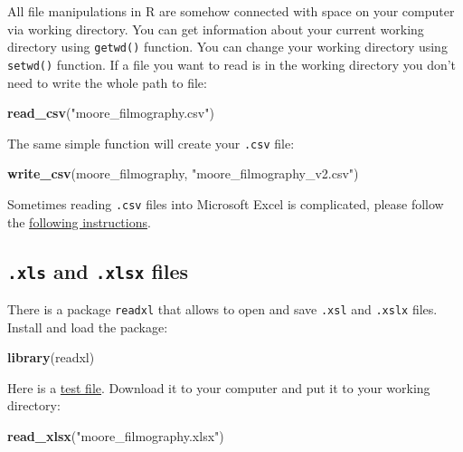 \documentclass[
]{book}
\newenvironment{Shaded}{\begin{snugshade}}{\end{snugshade}}
\newcommand{\KeywordTok}[1]{\textcolor[rgb]{0.13,0.29,0.53}{\textbf{#1}}}
\newcommand{\NormalTok}[1]{#1}
\newcommand{\StringTok}[1]{\textcolor[rgb]{0.31,0.60,0.02}{#1}}
\begin{document}
All file manipulations in R are somehow connected with space on your computer via working directory. You can get information about your current working directory using \texttt{getwd()} function. You can change your working directory using \texttt{setwd()} function. If a file you want to read is in the working directory you don't need to write the whole path to file:

\begin{Shaded}
\begin{Highlighting}[]
\KeywordTok{read_csv}\NormalTok{(}\StringTok{"moore_filmography.csv"}\NormalTok{)}
\end{Highlighting}
\end{Shaded}

The same simple function will create your \texttt{.csv} file:

\begin{Shaded}
\begin{Highlighting}[]
\KeywordTok{write_csv}\NormalTok{(moore_filmography, }\StringTok{"moore_filmography_v2.csv"}\NormalTok{)}
\end{Highlighting}
\end{Shaded}

Sometimes reading \texttt{.csv} files into Microsoft Excel is complicated, please follow the \href{https://www.thewindowsclub.com/how-to-convert-a-text-txt-csv-file-into-an-excel-file}{following instructions}.

\hypertarget{xls-and-.xlsx-files}{%
\subsection{\texorpdfstring{\texttt{.xls} and \texttt{.xlsx} files}{.xls and .xlsx files}}\label{xls-and-.xlsx-files}}

There is a package \texttt{readxl} that allows to open and save \texttt{.xsl} and \texttt{.xslx} files. Install and load the package:

\begin{Shaded}
\begin{Highlighting}[]
\KeywordTok{library}\NormalTok{(readxl)}
\end{Highlighting}
\end{Shaded}

Here is a \href{https://github.com/agricolamz/2020.02_Naumburg_R/raw/master/data/moore_filmography.xlsx}{test file}. Download it to your computer and put it to your working directory:

\begin{Shaded}
\begin{Highlighting}[]
\KeywordTok{read_xlsx}\NormalTok{(}\StringTok{"moore_filmography.xlsx"}\NormalTok{)}
\end{Highlighting}
\end{Shaded}
\end{document}
